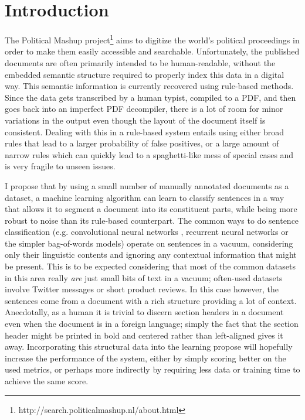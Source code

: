 \chapter{Introduction}
The Political Mashup
project\footnote{http://search.politicalmashup.nl/about.html} aims to digitize
the world's political proceedings in order to make them easily accessible and
searchable. Unfortunately, the published documents are often primarily intended
to be human-readable, without the embedded semantic structure required to
properly index this data in a digital way. This semantic information is
currently recovered using rule-based methods. Since the data gets transcribed by
a human typist, compiled to a PDF, and then goes back into an imperfect PDF
decompiler, there is a lot of room for minor variations in the output even
though the layout of the document itself is consistent. Dealing with this in a
rule-based system entails using either broad rules that lead to a larger
probability of false positives, or a large amount of narrow rules which can
quickly lead to a spaghetti-like mess of special cases and is very fragile to
unseen issues.

I propose that by using a small number of manually annotated documents as a
dataset, a machine learning algorithm can learn to classify sentences in a way
that allows it to segment a document into its constituent parts, while being
more robust to noise than its rule-based counterpart. The common ways to do
sentence classification (e.g. convolutional neural networks \citep{kim2014conv}
, recurrent neural networks or the simpler bag-of-words models) operate on
sentences in a vacuum, considering only their linguistic contents and ignoring
any contextual information that might be present. This is to be expected
considering that most of the common datasets in this area really \emph{are} just
small bits of text in a vacuum; often-used datasets involve Twitter messages
or short product reviews. In this case however, the sentences come from a
document with a rich structure providing a lot of context. Anecdotally, as a
human it is trivial to discern section headers in a document even when the
document is in a foreign language; simply the fact that the section header might
be printed in bold and centered rather than left-aligned gives it away.
Incorporating this structural data into the learning propose will hopefully
increase the performance of the system, either by simply scoring better on the
used metrics, or perhaps more indirectly by requiring less data or training time
to achieve the same score.

